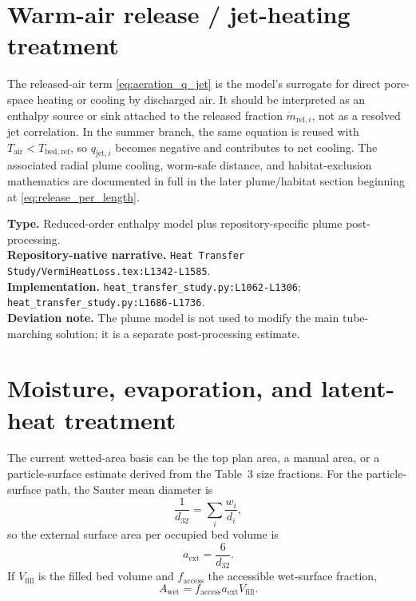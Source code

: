 \documentclass[11pt]{article}
\newcommand{\srcref}[1]{\nolinkurl{#1}}
\newcommand{\filepath}[1]{\nolinkurl{#1}}
\begin{document}
\section{Warm-air release / jet-heating treatment}
The released-air term \eqref{eq:aeration_q_jet} is the model's surrogate for direct pore-space heating or cooling by discharged air. It should be interpreted as an enthalpy source or sink attached to the released fraction \(\dot m_{\mathrm{rel},i}\), not as a resolved jet correlation. In the summer branch, the same equation is reused with \(T_{\mathrm{air}}<T_{\mathrm{bed,ref}}\), so \(q_{\mathrm{jet},i}\) becomes negative and contributes to net cooling. The associated radial plume cooling, worm-safe distance, and habitat-exclusion mathematics are documented in full in the later plume/habitat section beginning at \eqref{eq:release_per_length}.

\textbf{Type.} Reduced-order enthalpy model plus repository-specific plume post-processing. \\
\textbf{Repository-native narrative.} \filepath{Heat Transfer Study/VermiHeatLoss.tex:L1342-L1585}. \\
\textbf{Implementation.} \srcref{heat_transfer_study.py:L1062-L1306}; \srcref{heat_transfer_study.py:L1686-L1736}. \\
\textbf{Deviation note.} The plume model is not used to modify the main tube-marching solution; it is a separate post-processing estimate.

\section{Moisture, evaporation, and latent-heat treatment}
The current wetted-area basis can be the top plan area, a manual area, or a particle-surface estimate derived from the Table~3 size fractions. For the particle-surface path, the Sauter mean diameter is
\begin{equation}
\label{eq:sauter_diameter}
\frac{1}{d_{32}}=\sum_i\frac{w_i}{d_i},
\end{equation}
so the external surface area per occupied bed volume is
\begin{equation}
\label{eq:external_area_density}
a_{\mathrm{ext}}=\frac{6}{d_{32}}.
\end{equation}
If \(V_{\mathrm{fill}}\) is the filled bed volume and \(f_{\mathrm{access}}\) the accessible wet-surface fraction,
\begin{equation}
\label{eq:wetted_area}
A_{\mathrm{wet}}=f_{\mathrm{access}}a_{\mathrm{ext}}V_{\mathrm{fill}}.
\end{equation}
\end{document}
